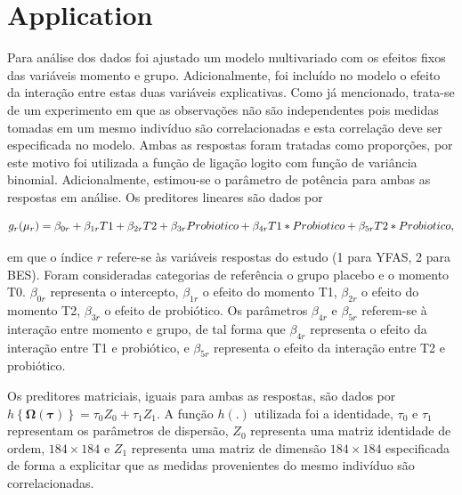 \documentclass[AMA,STIX1COL]{WileyNJD-v2}
\begin{document}

\section{Application}\label{sec6}


Para análise dos dados foi ajustado um modelo multivariado com os efeitos fixos das variáveis momento e grupo. Adicionalmente, foi incluído no modelo o efeito da interação entre estas duas variáveis explicativas. Como já mencionado, trata-se de um experimento em que as observações não são independentes pois medidas tomadas em um mesmo indivíduo são correlacionadas e esta correlação deve ser especificada no modelo. Ambas as respostas foram tratadas como proporções, por este motivo foi utilizada a função de ligação logito com função de variância binomial. Adicionalmente, estimou-se o parâmetro de potência para ambas as respostas em análise. Os preditores lineares são dados por

$$
g_{r}(\mu_{r}) = \beta_{0r} + \beta_{1r} T1 + \beta_{2r} T2 + \beta_{3r} Probiotico + \\ \beta_{4r} T1*Probiotico + \beta_{5r} T2*Probiotico,
$$

\noindent em que o índice $r$ refere-se às variáveis respostas do estudo (1 para YFAS, 2 para BES). Foram consideradas categorias de referência o grupo placebo e o momento T0. $\beta_{0r}$ representa o intercepto, $\beta_{1r}$ o efeito do momento T1, $\beta_{2r}$ o efeito do momento T2, $\beta_{3r}$ o efeito de probiótico. Os parâmetros $\beta_{4r}$ e $\beta_{5r}$ referem-se à interação entre momento e grupo, de tal forma que $\beta_{4r}$ representa o efeito da interação entre T1 e probiótico, e $\beta_{5r}$ representa o efeito da interação entre T2 e probiótico.

Os preditores matriciais, iguais para ambas as respostas, são dados por $h\left \{ \boldsymbol{\Omega}(\boldsymbol{\tau}) \right \} = \tau_0Z_0 + \tau_1Z_1$. A função $h(.)$ utilizada foi a identidade, $\tau_0$ e $\tau_1$ representam os parâmetros de dispersão, $Z_0$ representa uma matriz identidade de ordem, $184 \times 184$ e $Z_1$ representa uma matriz de dimensão $184 \times 184$ especificada de forma a explicitar que as medidas provenientes do mesmo indivíduo são correlacionadas. 
\end{document}
